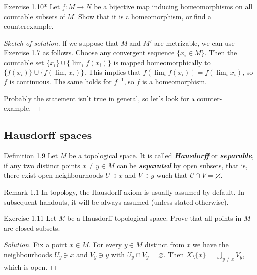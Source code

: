\begin{thing4}{Exercise 1.10*}\leavevmode
	Let $f:M\longrightarrow N$ be a bijective map inducing homeomorphisms on all countable subsets of $M$. Show that it is a homeomorphism, or find a counterexample.
\end{thing4}

\begin{proof}[{\color{2}Sketch of solution}]\leavevmode
	If we suppose that $M$ and $M'$ are metrizable, we can use Exercise \hyperref[exer:1.7]{1.7} as follows. Choose any convergent sequence $\{x_i \in M\}$. Then the countable set  $\{x_i\}\cup \{\lim_{i} f(x_i)\}$ is mapped homeomorphically to $\{f(x_i)\}\cup  \{f(\lim_{i} x_i)\}$. This implies that $f\left( \lim_{i} f(x_i) \right) =f \left( \lim_{i} x_i \right)$, so $f$ is continuous. The same holds for $f^{-1}$, so $f$ is a homeomorphism.

	Probably the statement isn't true in general, so let's look for a counter-example.
\end{proof}

\subsection{Hausdorff spaces}

\begin{thing3}{Definition 1.9}\leavevmode
	Let $M$ be a topological space. It is called \textit{\textbf{Hausdorff}} or \textit{\textbf{separable}}, if any two distinct points $x \neq  y \in M$ can be \textit{\textbf{separated}} by open subsets, that is, there exist open neighbourhoods $U \ni x$ and $V \ni y$ wuch that $U\cap V= \varnothing$.
\end{thing3}

\begin{thing5}{Remark 1.1}\leavevmode
	In topology, the Hausdorff axiom is usually assumed by default. In subsequent handouts, it will be always assumed (unless stated otherwise).
\end{thing5}

\begin{thing4}{Exercise 1.11}\label{exer:1.11}\leavevmode
	Let $M$ be a Hausdorff topological space. Prove that all points in $M$ are closed subsets.
\end{thing4}

\begin{proof}[Solution]\leavevmode
Fix a point $x \in M$. For every $y \in M$ distinct from $x$ we have the neighbourhoods $U_y \ni x$ and $V_y \ni y$ with $U_y \cap V_y = \varnothing$. Then $X\setminus\{x\}=\bigcup_{y \neq x} V_y$, which is open.
\end{proof}

